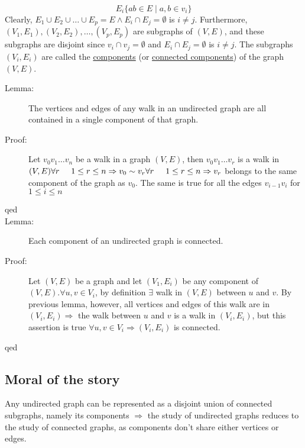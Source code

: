 \documentclass[10pt]{article}
\begin{document}
	\[E_i \{ab \in E \mid a, b \in v_i \}\]
	Clearly, $E_1 \cup E_2 \cup \dots \cup E_p = E \land E_i \cap E_j = \emptyset$ is $i \neq j$. Furthermore, $(V_1, E_1), (V_2, E_2), \dots, (V_p, E_p)$ are subgraphs of $(V, E)$, and these subgraphs are disjoint since $v_i \cap v_j = \emptyset$ and $E_i \cap E_j = \emptyset$ is $i \neq j$. The subgraphs $(V_i, E_i)$ are called the \underline{components} (or \underline{connected components}) of the graph $(V, E)$.
	\begin{description}
		\item[Lemma:] The vertices and edges of any walk in an undirected graph are all contained in a single component of that graph.
		\item[Proof:] Let $v_0 v_1 \dots v_n$ be a walk in a graph $(V, E)$, then $v_0 v_1 \dots v_r$ is a walk in $(V, E) \forall r \hspace{5mm} 1 \leq r \leq n \Rightarrow v_0 \sim v_r \forall r \hspace{5mm} 1 \leq r \leq n \Rightarrow v_r$ belongs to the same component of the graph as $v_0$. The same is true for all the edges $v_{i-1}v_i$ for $1 \leq i \leq n$
		\item[qed]
		\item[Lemma:] Each component of an undirected graph is connected.
		\item[Proof:] Let $(V, E)$ be a graph and let $(V_1, E_i)$ be any component of $(V, E). \forall u, v \in V_i$, by definition $\exists$ walk in $(V, E)$ between $u$ and $v$. By previous lemma, however, all vertices and edges of this walk are in $(V_i, E_i) \Rightarrow$ the walk between $u$ and $v$ is a walk in $(V_i, E_i)$, but this assertion is true $\forall u, v \in V_i \Rightarrow (V_i, E_i)$ is connected.
		\item[qed]
	\end{description}
	
	\subsection{Moral of the story}
	Any undirected graph can be represented as a disjoint union of connected subgraphs, namely its components $\Rightarrow$ the study of undirected graphs reduces to the study of connected graphs, as components don't share either vertices or edges.
	
\end{document}
